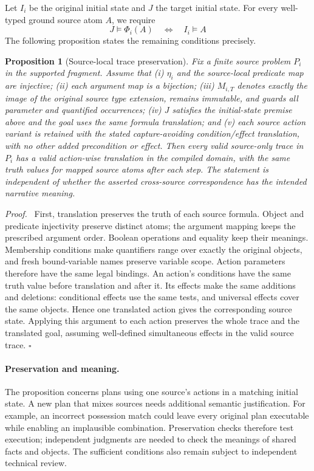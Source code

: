 \documentclass[letterpaper]{article}
\newtheorem{proposition}{Proposition}
\newenvironment{proof}{\par\noindent\textit{Proof.}\ }{\hfill$\square$\par}
\newcommand{\enc}{\Phi}
\begin{document}
Let $I_i$ be the original initial state and $J$ the target initial state. For every well-typed ground source atom $A$, we require
\[
J\models\enc_i(A)\quad\Longleftrightarrow\quad I_i\models A
\]
The following proposition states the remaining conditions precisely.

\begin{proposition}[Source-local trace preservation]
\label{prop:source-local}
Fix a finite source problem $P_i$ in the supported fragment. Assume that (i) $\eta_i$ and the source-local predicate map are injective; (ii) each argument map is a bijection; (iii) $M_{i,T}$ denotes exactly the image of the original source type extension, remains immutable, and guards all parameter and quantified occurrences; (iv) $J$ satisfies the initial-state premise above and the goal uses the same formula translation; and (v) each source action variant is retained with the stated capture-avoiding condition/effect translation, with no other added precondition or effect. Then every valid source-only trace in $P_i$ has a valid action-wise translation in the compiled domain, with the same truth values for mapped source atoms after each step. The statement is independent of whether the asserted cross-source correspondence has the intended narrative meaning.
\end{proposition}
\begin{proof}
First, translation preserves the truth of each source formula. Object and predicate injectivity preserve distinct atoms; the argument mapping keeps the prescribed argument order. Boolean operations and equality keep their meanings. Membership conditions make quantifiers range over exactly the original objects, and fresh bound-variable names preserve variable scope. Action parameters therefore have the same legal bindings. An action's conditions have the same truth value before translation and after it. Its effects make the same additions and deletions: conditional effects use the same tests, and universal effects cover the same objects. Hence one translated action gives the corresponding source state. Applying this argument to each action preserves the whole trace and the translated goal, assuming well-defined simultaneous effects in the valid source trace.
\end{proof}

\paragraph{Preservation and meaning.}
The proposition concerns plans using one source's actions in a matching initial state. A new plan that mixes sources needs additional semantic justification. For example, an incorrect possession match could leave every original plan executable while enabling an implausible combination. Preservation checks therefore test execution; independent judgments are needed to check the meanings of shared facts and objects. The sufficient conditions also remain subject to independent technical review.
\end{document}

